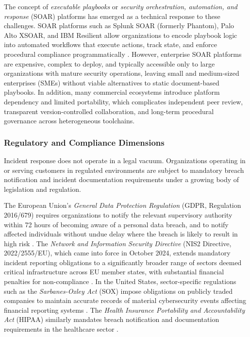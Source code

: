 The concept of \textit{executable playbooks} or \textit{security orchestration, automation, and response} (SOAR) platforms has emerged as a technical response to these challenges.
SOAR platforms such as Splunk SOAR (formerly Phantom), Palo Alto XSOAR, and IBM Resilient allow organizations to encode playbook logic into automated workflows that execute actions, track state, and enforce procedural compliance programmatically \autocite{gartner2023,cloudsek2026,shuffleosoar}.
However, enterprise SOAR platforms are expensive, complex to deploy, and typically accessible only to large organizations with mature security operations, leaving small and medium-sized enterprises (SMEs) without viable alternatives to static document-based playbooks.
In addition, many commercial ecosystems introduce platform dependency and limited portability, which complicates independent peer review, transparent version-controlled collaboration, and long-term procedural governance across heterogeneous toolchains.

\subsubsection{Regulatory and Compliance Dimensions}

Incident response does not operate in a legal vacuum.
Organizations operating in or serving customers in regulated environments are subject to mandatory breach notification and incident documentation requirements under a growing body of legislation and regulation.

The European Union's \textit{General Data Protection Regulation} (GDPR, Regulation 2016/679) requires organizations to notify the relevant supervisory authority within 72 hours of becoming aware of a personal data breach, and to notify affected individuals without undue delay where the breach is likely to result in high risk \citep{gdpr2016,nis22022,sox2002,hipaa1996}.
The \textit{Network and Information Security Directive} (NIS2 Directive, 2022/2555/EU), which came into force in October 2024, extends mandatory incident reporting obligations to a significantly broader range of sectors deemed critical infrastructure across EU member states, with substantial financial penalties for non-compliance \citep{gdpr2016,nis22022,sox2002,hipaa1996}.
In the United States, sector-specific regulations such as the \textit{Sarbanes-Oxley Act} (SOX) impose obligations on publicly traded companies to maintain accurate records of material cybersecurity events affecting financial reporting systems \citep{gdpr2016,nis22022,sox2002,hipaa1996}.
The \textit{Health Insurance Portability and Accountability Act} (HIPAA) similarly mandates breach notification and documentation requirements in the healthcare sector \citep{gdpr2016,nis22022,sox2002,hipaa1996}.

